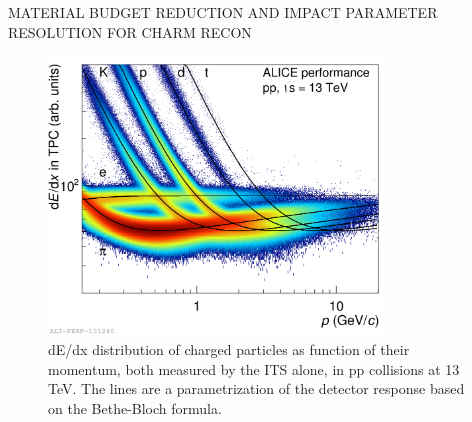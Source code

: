 MATERIAL BUDGET REDUCTION AND IMPACT PARAMETER RESOLUTION FOR CHARM RECON
\begin{figure}[t]
\centering
\includegraphics[width=0.8\textwidth]{Images/Chapter3/dEdx_13TeV}
\caption[dE/dx distribution of charged particles as function of their momentum, both measured by the ITS alone, in pp collisions at 13 TeV. The lines are a parametrization of the detector response based on the Bethe-Bloch formula.]{dE/dx distribution of charged particles as function of their momentum, both measured by the ITS alone, in pp collisions at 13 TeV. The lines are a parametrization of the detector response based on the Bethe-Bloch formula.}
\label{Fig:cap3-1.5}
\end{figure}

